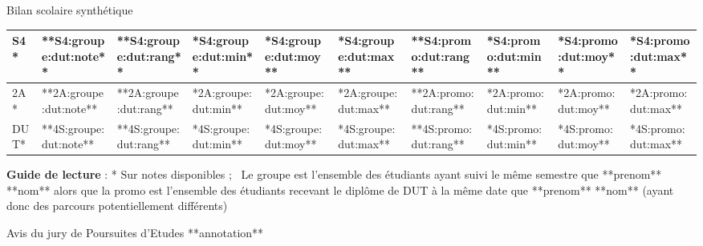 \begin{rubrique}{Bilan scolaire synthétique}
\begin{tabular}{|p{}|p{}|*{8}{p{}|}}
\hline  S4* & **S4:groupe:dut:note** & **S4:groupe:dut:rang** 
																		& {\scriptsize **S4:groupe:dut:min**}
																		& {\scriptsize **S4:groupe:dut:moy**}
																		& {\scriptsize **S4:groupe:dut:max**}
																		& **S4:promo:dut:rang** 
																		& {\scriptsize **S4:promo:dut:min**}
																		& {\scriptsize **S4:promo:dut:moy**}
																		& {\scriptsize **S4:promo:dut:max**}  \\
\hline
\hline  \cellcolor{black!20} 2A* & **2A:groupe:dut:note** & **2A:groupe:dut:rang** 
																		& {\scriptsize **2A:groupe:dut:min**}
																		& {\scriptsize **2A:groupe:dut:moy**}
																		& {\scriptsize **2A:groupe:dut:max**}
																		& **2A:promo:dut:rang** 
																		& {\scriptsize **2A:promo:dut:min**}
																		& {\scriptsize **2A:promo:dut:moy**}
																		& {\scriptsize **2A:promo:dut:max**}  \\
\hline
\hline  DUT* & **4S:groupe:dut:note** & **4S:groupe:dut:rang** 
																		& {\scriptsize **4S:groupe:dut:min**}
																		& {\scriptsize **4S:groupe:dut:moy**}
																		& {\scriptsize **4S:groupe:dut:max**}
																		& **4S:promo:dut:rang** 
																		& {\scriptsize **4S:promo:dut:min**}
																		& {\scriptsize **4S:promo:dut:moy**}
																		& {\scriptsize **4S:promo:dut:max**}  \\
\hline
\end{tabular}

\begin{minipage}{\textwidth}
\scriptsize 
\textbf{Guide de lecture} : * Sur notes disponibles ; \textdagger~Le groupe est l'ensemble des étudiants ayant suivi le même semestre que **prenom** **nom** alors que la promo est l'ensemble des étudiants recevant le diplôme de DUT à la même date que **prenom** **nom** (ayant donc des parcours potentiellement différents)
\end{minipage}

\end{rubrique}


\begin{rubrique}{Avis du jury de Poursuites d'Etudes}
**annotation**
\end{rubrique}

